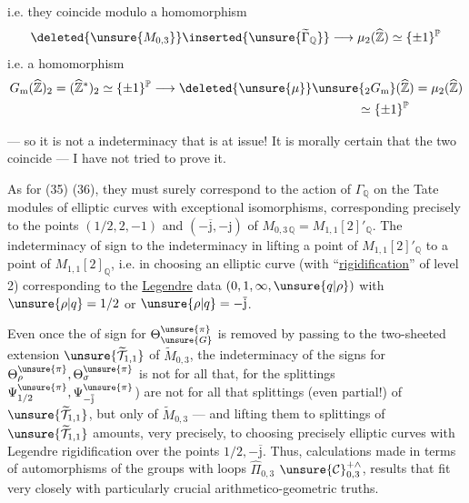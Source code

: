 i.e. they coincide modulo a homomorphism
\[
\deleted{\unsure{M_{0,3}}}\inserted{\unsure{\widetilde\Gamma_{\mathbb Q}}}
\longrightarrow\mu_2(\widehat{\mathbb Z})\simeq\{\pm1\}^{\mathbb P}
\]
i.e. a homomorphism
\[
\begin{aligned}
G_{\mathrm m}(\widehat{\mathbb Z})_2
&=(\widehat{\mathbb Z}^{*})_2\simeq\{\pm1\}^{\mathbb P}
\longrightarrow\deleted{\unsure{\mu}}\unsure{{}_2G_{\mathrm m}}(\widehat{\mathbb Z})
=\mu_2(\widehat{\mathbb Z})\\
&\hspace{24em}\simeq\{\pm1\}^{\mathbb P}
\end{aligned}
\]

--- so it is not a  indeterminacy that is at issue!
It is morally certain that the two coincide --- I have not tried to
prove it.

As for (35) (36), they must surely correspond to the action of
$\Gamma_{\mathbb Q}$ on the Tate modules of elliptic curves with
exceptional isomorphisms, corresponding precisely to the points
$(1/2,2,-1)$ and $(-\overline{\mathrm j},-\mathrm j)$ of
$M_{0,3\,\mathbb Q}=M_{1,1}[2]'_{\mathbb Q}$.
The indeterminacy of sign   to the indeterminacy
in lifting a point of $M_{1,1}[2]'_{\mathbb Q}$ to a point of
$M_{1,1}[2]_{\mathbb Q}$, i.e. in choosing an elliptic curve
(with ``\uline{rigidification}'' of level 2) corresponding to the
\uline{Legendre} data $(0,1,\infty,\unsure{q|\rho})$ with
$\unsure{\rho|q}=1/2$ or $\unsure{\rho|q}=-\overline{\mathrm j}$.

Even once the  of sign for
$\Theta_{\unsure{G}}^{\unsure{\pi}}$ is removed by passing to the two-sheeted extension
$\unsure{\widetilde{\mathcal T}_{1,1}}$ of
$\widetilde M_{0,3}$, the indeterminacy of the signs for
$\Theta_{\rho}^{\unsure{\pi}},\Theta_{\sigma}^{\unsure{\pi}}$
is not  for all that, for the splittings
\deleted{$\unsure{\Psi_{\rho}^{\pi},\Psi_{\sigma}^{\pi}}$}
$\Psi_{1/2}^{\unsure{\pi}},\Psi_{-\overline{\mathrm j}}^{\unsure{\pi}}$)
are not for all that splittings (even partial!)
of  
$\unsure{\widetilde{\mathcal T}_{1,1}}$, but only of
$\widetilde M_{0,3}$ --- and lifting them to splittings of
$\unsure{\widetilde{\mathcal T}_{1,1}}$
amounts, very precisely, to choosing precisely elliptic curves with
Legendre rigidification over the points $1/2,-\overline{\mathrm j}$.
Thus, calculations made in terms of automorphisms of the groups with loops
$\widehat\Pi_{0,3}$  
$\unsure{\mathcal{C}}_{0,3}^{+\wedge}$,
 
results that fit very closely with particularly crucial
arithmetico-geometric truths.

